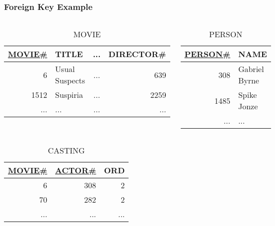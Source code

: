 \documentclass[dvipsnames]{beamer}
\theoremstyle{plain}
\begin{document}
\begin{frame}
  \frametitle{Foreign Key Example}

  \begin{example}
    \begin{columns}
      \begin{tiny}
      \begin{table}
        \caption{MOVIE}
        \begin{tabular}{|r|l|c|r|}\hline
\underline{MOVIE\#} & TITLE & ... & DIRECTOR\#\\[2pt]\hline\hline
         6 & Usual Suspects & ... &        639\\\hline
      1512 & Suspiria       & ... &       2259\\\hline
       ... & ...            & ... &        ...\\\hline
        \end{tabular}
      \end{table}
      \end{tiny}

      \begin{tiny}
      \begin{table}
        \caption{PERSON}
        \begin{tabular}{|r|l|}\hline
\underline{PERSON\#} & NAME\\[2pt]\hline\hline
        308 & Gabriel Byrne\\\hline
       1485 & Spike Jonze  \\\hline
        ... & ...          \\\hline
        \end{tabular}
      \end{table}
      \end{tiny}
    \end{columns}

    \begin{tiny}
    \begin{table}
      \caption{CASTING}
      \begin{tabular}{|r|r|r|}\hline
\underline{MOVIE\#} & \underline{ACTOR\#} & ORD\\[2pt]\hline\hline
                  6 &                 308 &   2\\\hline
                 70 &                 282 &   2\\\hline
                ... &                 ... & ...\\\hline
      \end{tabular}
    \end{table}
    \end{tiny}
  \end{example}


\end{frame}
\end{document}
